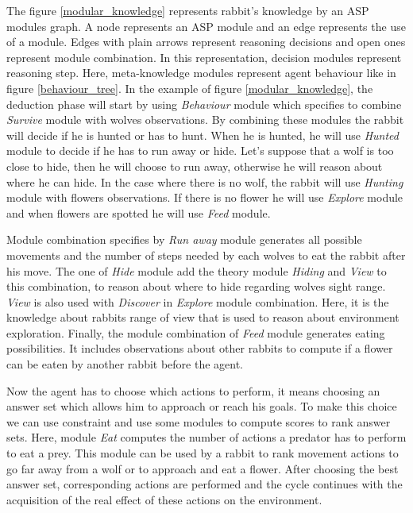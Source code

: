 \documentclass{aamas2012}
\begin{document}
	The figure \ref{modular_knowledge} represents rabbit's knowledge by an ASP modules graph.
	A node represents an ASP module and an edge represents the use of a module.
	Edges with plain arrows represent reasoning decisions and open ones represent module combination.
	In this representation, decision modules represent reasoning step.
	Here, meta-knowledge modules represent agent behaviour like in figure \ref{behaviour_tree}.
	In the example of figure \ref{modular_knowledge}, 
	the deduction phase will start by using \emph{Behaviour} module which specifies to combine \emph{Survive} module with wolves observations.
	By combining these modules the rabbit will decide if he is hunted or has to hunt.
	When he is hunted, he will use \emph{Hunted} module to decide if he has to run away or hide.
	Let's suppose that a wolf is too close to hide, then he will choose to run away, otherwise he will reason about where he can hide.
	In the case where there is no wolf, the rabbit will use \emph{Hunting} module with flowers observations.
	If there is no flower he will use \emph{Explore} module and when flowers are spotted he will use \emph{Feed} module.
	
	Module combination specifies by \emph{Run away} module generates all possible movements and the number of steps needed by each wolves to eat the rabbit after his move.
	The one of \emph{Hide} module add the theory module \emph{Hiding} and \emph{View} to this combination, to reason about where to hide regarding wolves sight range. 
	\emph{View} is also used with \emph{Discover} in \emph{Explore} module combination.
	Here, it is the knowledge about rabbits range of view that is used to reason about environment exploration.
	Finally, the module combination of \emph{Feed} module generates eating possibilities.
	It includes observations about other rabbits to compute if a flower can be eaten by another rabbit before the agent.
	
	Now the agent has to choose which actions to perform, it means choosing an answer set which allows him to approach or reach his goals.
	To make this choice we can use constraint and use some modules to compute scores to rank answer sets.
	Here, module \emph{Eat} computes the number of actions a predator has to perform to eat a prey.
	This module can be used by a rabbit to rank movement actions to go far away from a wolf or to approach and eat a flower.
	After choosing the best answer set, corresponding actions are performed and 
	the cycle continues with the acquisition of the real effect of these actions on the environment.
\end{document}
